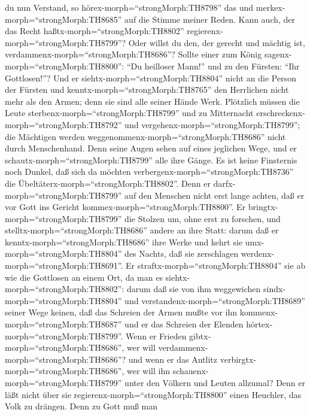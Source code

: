 du nun Verstand, so hörex-morph=``strongMorph:TH8798'' das und
merkex-morph=``strongMorph:TH8685'' auf die Stimme meiner Reden.
 Kann auch, der das Recht
haßtx-morph=``strongMorph:TH8802''
regierenx-morph=``strongMorph:TH8799''? Oder willst du den, der gerecht
und mächtig ist, verdammenx-morph=``strongMorph:TH8686''? 
Sollte einer zum König sagenx-morph=``strongMorph:TH8800'': ``Du
heilloser Mann!'' und zu den Fürsten: ``Ihr Gottlosen!''? 
Und er siehtx-morph=``strongMorph:TH8804'' nicht an die Person der
Fürsten und kenntx-morph=``strongMorph:TH8765'' den Herrlichen nicht
mehr als den Armen; denn sie sind alle seiner Hände Werk. 
Plötzlich müssen die Leute sterbenx-morph=``strongMorph:TH8799'' und zu
Mitternacht erschreckenx-morph=``strongMorph:TH8792'' und
vergehenx-morph=``strongMorph:TH8799''; die Mächtigen werden
weggenommenx-morph=``strongMorph:TH8686'' nicht durch Menschenhand.
 Denn seine Augen sehen auf eines jeglichen Wege, und er
schautx-morph=``strongMorph:TH8799'' alle ihre Gänge.  Es
ist keine Finsternis noch Dunkel, daß sich da möchten
verbergenx-morph=``strongMorph:TH8736'' die
Übeltäterx-morph=``strongMorph:TH8802''.  Denn er
darfx-morph=``strongMorph:TH8799'' auf den Menschen nicht erst lange
achten, daß er vor Gott ins Gericht kommex-morph=``strongMorph:TH8800''.
 Er bringtx-morph=``strongMorph:TH8799'' die Stolzen um,
ohne erst zu forschen, und stelltx-morph=``strongMorph:TH8686'' andere
an ihre Statt:  darum daß er
kenntx-morph=``strongMorph:TH8686'' ihre Werke und kehrt sie
umx-morph=``strongMorph:TH8804'' des Nachts, daß sie zerschlagen
werdenx-morph=``strongMorph:TH8691''.  Er
straftx-morph=``strongMorph:TH8804'' sie ab wie die Gottlosen an einem
Ort, da man es siehtx-morph=``strongMorph:TH8802'':  darum
daß sie von ihm weggewichen sindx-morph=``strongMorph:TH8804'' und
verstandenx-morph=``strongMorph:TH8689'' seiner Wege keinen,
 daß das Schreien der Armen mußte vor ihn
kommenx-morph=``strongMorph:TH8687'' und er das Schreien der Elenden
hörtex-morph=``strongMorph:TH8799''.  Wenn er Frieden
gibtx-morph=``strongMorph:TH8686'', wer will
verdammenx-morph=``strongMorph:TH8686''? und wenn er das Antlitz
verbirgtx-morph=``strongMorph:TH8686'', wer will ihn
schauenx-morph=``strongMorph:TH8799'' unter den Völkern und Leuten
allzumal?  Denn er läßt nicht über sie
regierenx-morph=``strongMorph:TH8800'' einen Heuchler, das Volk zu
drängen.  Denn zu Gott muß man
